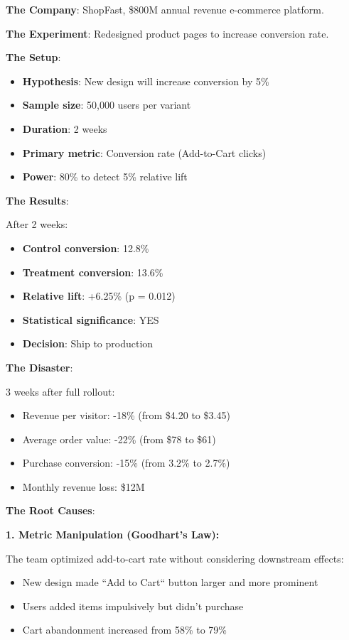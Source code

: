 \textbf{The Company}: ShopFast, \$800M annual revenue e-commerce platform.

\textbf{The Experiment}: Redesigned product pages to increase conversion rate.

\textbf{The Setup}:
\begin{itemize}
    \item \textbf{Hypothesis}: New design will increase conversion by 5\%
    \item \textbf{Sample size}: 50,000 users per variant
    \item \textbf{Duration}: 2 weeks
    \item \textbf{Primary metric}: Conversion rate (Add-to-Cart clicks)
    \item \textbf{Power}: 80\% to detect 5\% relative lift
\end{itemize}

\textbf{The Results}:

After 2 weeks:
\begin{itemize}
    \item \textbf{Control conversion}: 12.8\%
    \item \textbf{Treatment conversion}: 13.6\%
    \item \textbf{Relative lift}: +6.25\% (p = 0.012)
    \item \textbf{Statistical significance}: YES
    \item \textbf{Decision}: Ship to production
\end{itemize}

\textbf{The Disaster}:

3 weeks after full rollout:
\begin{itemize}
    \item Revenue per visitor: -18\% (from \$4.20 to \$3.45)
    \item Average order value: -22\% (from \$78 to \$61)
    \item Purchase conversion: -15\% (from 3.2\% to 2.7\%)
    \item Monthly revenue loss: \$12M
\end{itemize}

\textbf{The Root Causes}:

\textbf{1. Metric Manipulation (Goodhart's Law):}

The team optimized add-to-cart rate without considering downstream effects:
\begin{itemize}
    \item New design made ``Add to Cart`` button larger and more prominent
    \item Users added items impulsively but didn't purchase
    \item Cart abandonment increased from 58\% to 79\%
\end{itemize}

